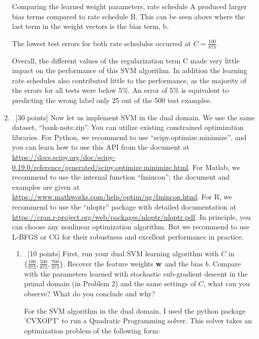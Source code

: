 \documentclass[12pt, fullpage,letterpaper]{article}
\begin{document}
\begin{enumerate}
	Comparing the learned weight parameters, rate schedule A produced larger bias terms compared to rate schedule B. This can be seen above where the last term in the weight vectors is the bias term, b.
	
	The lowest test errors for both rate schedules occurred at $C=\frac{100}{873}$.
	
	Overall, the different values of the regularization term C made very little impact on the performance of this SVM algorithm. In addition the learning rate schedules also contributed little to the performance, as the majority of the errors for all tests were below 5$\%$. An error of 5$\%$ is equivalent to predicting the wrong label only 25 out of the 500 test examples. 
	
	
	
	
	

\pagebreak

\item~[30 points] Now let us implement SVM in the dual domain. We use the same dataset, ``bank-note.zip''. You can utilize existing constrained optimization libraries. For Python, we recommend to use ``scipy.optimize.minimize'', and you can learn how to use this API from the document at \url{https://docs.scipy.org/doc/scipy-0.19.0/reference/generated/scipy.optimize.minimize.html}.
For Matlab, we recommend to use the internal function ``fmincon''; the document and examples are given at \url{https://www.mathworks.com/help/optim/ug/fmincon.html}. For R, we recommend to use the ``nloptr'' package with detailed documentation at \url{https://cran.r-project.org/web/packages/nloptr/nloptr.pdf}. In principle, you can choose any nonlinear optimization algorithm. But we recommend to use L-BFGS or CG for their robustness and excellent performance in practice. 

\begin{enumerate}
	\item ~[10 points] First, run your dual SVM learning algorithm with   $C$ in $\{\frac{100}{873}, \frac{500}{873}, \frac{700}{873}\}$. Recover the feature weights ${\bf w}$ and the bias $b$. Compare with the parameters learned with stochastic sub-gradient descent in the primal domain (in Problem 2) and the same settings of $C$, what can you observe? What do you conclude and why?
	
	For the SVM algorithm in the dual domain, I used the python package 'CVXOPT' to run a Quadratic Programming solver. This solver takes an optimization problem of the following form:
	

\end{enumerate}
\end{enumerate}
\end{document}
